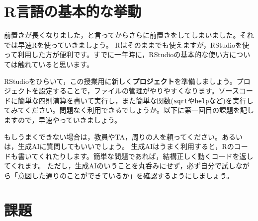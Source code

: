 \documentclass{ltjsbook}
\begin{document}
\section{R言語の基本的な挙動}
前置きが長くなりました，と言ってからさらに前置きをしてしまいました。それでは早速Rを使っていきましょう。
Rはそのままでも使えますが，RStudioを使って利用した方が便利です。すでに一年時に，RStudioの基本的な使い方については触れていると思います。

RStudioをひらいて，この授業用に新しく\textbf{プロジェクト}を準備しましょう。プロジェクトを設定することで，ファイルの管理がやりやすくなります。ソースコードに簡単な四則演算を書いて実行し，また簡単な関数(\verb|sqrt|や\verb|help|など)を実行してみてください。問題なく利用できるでしょうか。以下に第一回目の課題を記しますので，早速やっていきましょう。

もしうまくできない場合は，教員やTA，周りの人を頼ってください。あるいは，生成AIに質問してもいいでしょう。
生成AIはうまく利用すると，Rのコードも書いてくれたりします。簡単な問題であれば，結構正しく動くコードを返してくれます。
ただし，生成AIのいうことを丸呑みにせず，必ず自分で試しながら「意図した通りのことができているか」を確認するようにしましょう。
\section{課題}
\end{document}
